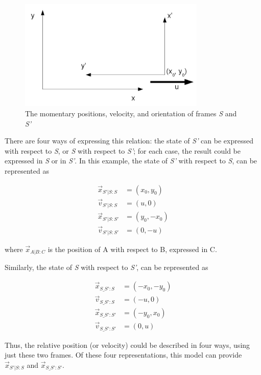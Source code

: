 \begin{figure}[ht]
\begin{center}
\includegraphics[width=3.5in]{figures/rel_state_ref_orient.jpg}
\caption{The momentary positions, velocity, and orientation of frames \textit{S} and \textit{S'}}
\label{fig:relstatereforient}
\end{center}
\end{figure}

There are four ways of expressing this relation:  the state of \textit{S'} can be expressed with respect to \textit{S}, or \textit{S} with respect to \textit{S'}; for each case, the result could be expressed in \textit{S} or in \textit{S'}.  In this example, the state of  \textit{S'} with respect to \textit{S}, can be represented as 

\begin{align*}
\vec x_{S'|S:S} & = (x_0, y_0) \\ 
\vec v_{S'|S:S} & = (u,0)\\
\vec x_{S'|S:S'} & = (y_0, -x_0) \\
\vec v_{S'|S:S'} & = (0,-u)
\end{align*}

where $ \vec x_{A|B:C}$ is the position of A with respect to B, expressed in C.

Similarly, the state of  \textit{S} with respect to \textit{S'}, can be represented as 

\begin{align*}
\vec x_{S\_S':S} & = (-x_0, -y_0) \\
\vec v_{S\_S':S} & = (-u,0)\\
\vec x_{S\_S':S'} & = (-y_0, x_0)\\
\vec v_{S\_S':S'} & = (0,u)
\end{align*}

Thus, the relative position (or velocity) could be described in four ways, using just these two frames.  Of these four representations, this model can provide $\vec x_{S'|S:S}$ and $\vec x_{S\_S':S'}$.

